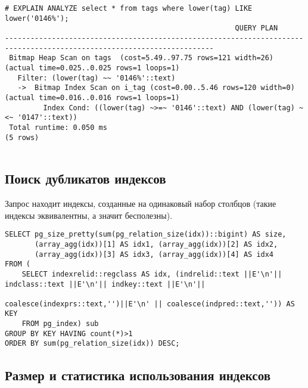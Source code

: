 \begin{lstlisting}[label=lst:snippets14,title=snippets/speed\_like.sql]
# EXPLAIN ANALYZE select * from tags where lower(tag) LIKE lower('0146%');
                                                      QUERY PLAN
-----------------------------------------------------------------------------------------------------------------------
 Bitmap Heap Scan on tags  (cost=5.49..97.75 rows=121 width=26) (actual time=0.025..0.025 rows=1 loops=1)
   Filter: (lower(tag) ~~ '0146%'::text)
   ->  Bitmap Index Scan on i_tag (cost=0.00..5.46 rows=120 width=0) (actual time=0.016..0.016 rows=1 loops=1)
         Index Cond: ((lower(tag) ~>=~ '0146'::text) AND (lower(tag) ~<~ '0147'::text))
 Total runtime: 0.050 ms
(5 rows)


\end{lstlisting}

\subsection{Поиск дубликатов индексов}
Запрос находит индексы, созданные на одинаковый набор столбцов (такие индексы эквивалентны, а значит бесполезны).

\begin{lstlisting}[label=lst:snippets15,title=snippets/duplicate\_indexes.sql]
SELECT pg_size_pretty(sum(pg_relation_size(idx))::bigint) AS size,
       (array_agg(idx))[1] AS idx1, (array_agg(idx))[2] AS idx2,
       (array_agg(idx))[3] AS idx3, (array_agg(idx))[4] AS idx4
FROM (
    SELECT indexrelid::regclass AS idx, (indrelid::text ||E'\n'|| indclass::text ||E'\n'|| indkey::text ||E'\n'||
                                         coalesce(indexprs::text,'')||E'\n' || coalesce(indpred::text,'')) AS KEY
    FROM pg_index) sub
GROUP BY KEY HAVING count(*)>1
ORDER BY sum(pg_relation_size(idx)) DESC;
\end{lstlisting}

\subsection{Размер и статистика использования индексов}

